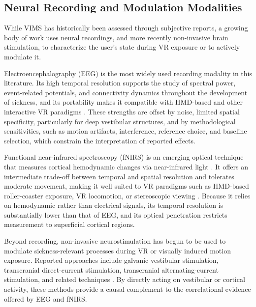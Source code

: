 \subsection{Neural Recording and Modulation Modalities}
\enlargethispage{\baselineskip}
While VIMS has historically been assessed through subjective reports, a growing body of work uses neural recordings, and more recently non-invasive brain stimulation, to characterize the user's state during VR exposure or to actively modulate it.

Electroencephalography (EEG) is the most widely used recording modality in this literature.
Its high temporal resolution supports the study of spectral power, event-related potentials, and connectivity dynamics throughout the development of sickness, and its portability makes it compatible with HMD-based and other interactive VR paradigms \cite{cortesEEGbasedExperimentVR2023, krokosQuantifyingVRCybersickness2022}.
These strengths are offset by noise, limited spatial specificity, particularly for deep vestibular structures, and by methodological sensitivities, such as motion artifacts, interference, reference choice, and baseline selection, which constrain the interpretation of reported effects.

Functional near-infrared spectroscopy (fNIRS) is an emerging optical technique that measures cortical hemodynamic changes via near-infrared light \cite{scholkmannReviewContinuousWave2014, pintiPresentFutureUse2020}.
It offers an intermediate trade-off between temporal and spatial resolution and tolerates moderate movement, making it well suited to VR paradigms such as HMD-based roller-coaster exposure, VR locomotion, or stereoscopic viewing \cite{yeoInvestigatingCorticalActivity2024, yamamuraHemodynamicVRAdaptingUsers2021, yamamuraPleasantLocomotionReducing2020, tanimuraEffectsLowResolution3D2019}.
Because it relies on hemodynamic rather than electrical signals, its temporal resolution is substantially lower than that of EEG, and its optical penetration restricts measurement to superficial cortical regions.

Beyond recording, non-invasive neurostimulation has begun to be used to modulate sickness-relevant processes during VR or visually induced motion exposure.
Reported approaches include galvanic vestibular stimulation, transcranial direct-current stimulation, transcranial alternating-current stimulation, and related techniques \cite{benelliFrequencyDependentReductionCybersickness2023}.
By directly acting on vestibular or cortical activity, these methods provide a causal complement to the correlational evidence offered by EEG and fNIRS.
